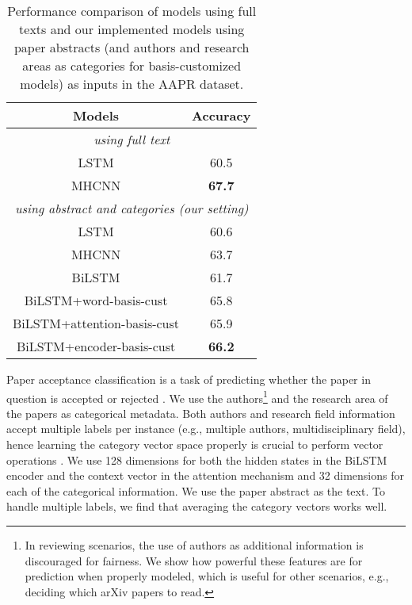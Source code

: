 \documentclass[11pt,a4paper]{article}
\begin{document}
\begin{table}[t]
  \centering
    \begin{tabular}{|c|c|}
    \hline
    Models & Accuracy \\
    \hline
    \multicolumn{2}{|c|}{\textit{using full text} \cite{yang2018automatic}} \\
    \hline
    LSTM  & 60.5 \\ 
    MHCNN & \textbf{67.7} \\
    \hline
    \multicolumn{2}{|c|}{\textit{using abstract and categories (our setting)}} \\
    \hline
    LSTM  & 60.6 \\
    MHCNN & 63.7 \\
    BiLSTM & 61.7 \\
    BiLSTM+word-basis-cust & 65.8 \\
    BiLSTM+attention-basis-cust & 65.9 \\
    BiLSTM+encoder-basis-cust & \textbf{66.2} \\
    \hline
    \end{tabular}\caption{Performance comparison of models using full texts and our implemented models using paper abstracts (and authors and research areas as categories for basis-customized models) as inputs in the AAPR dataset.}
  \label{tab:aaprresult}\end{table}

Paper acceptance classification is a task of predicting whether the paper in question is accepted or rejected \cite{yang2018automatic}. We use the authors\footnote{In reviewing scenarios, the use of authors as additional information is discouraged for fairness. We show how powerful these features are for prediction when properly modeled, which is useful for other scenarios, e.g., deciding which arXiv papers to read.} and the research area of the papers as categorical metadata.
Both authors and research field information accept multiple labels per instance (e.g., multiple authors, multidisciplinary field), hence learning the category vector space properly is crucial to perform vector operations \cite{mikolov2013efficient}. We use 128 dimensions for both the hidden states in the \mbox{BiLSTM} encoder and the context vector in the attention mechanism and 32 dimensions for each of the categorical information. We use the paper abstract as the text. To handle multiple labels, we find that averaging the category vectors works well.
\end{document}
